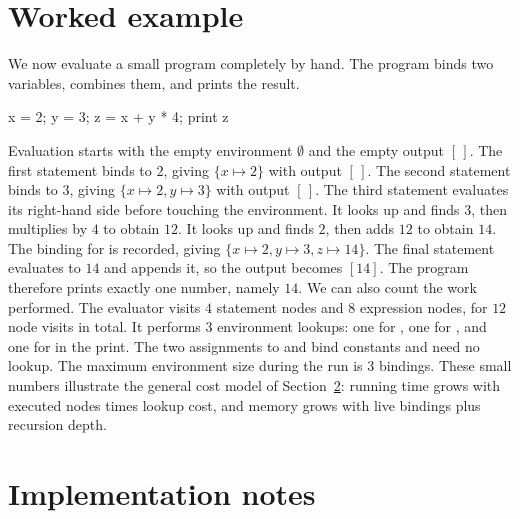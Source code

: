 \section{Worked example}
\label{sec:ch02-worked-example}

We now evaluate a small program completely by hand.
The program binds two variables, combines them, and prints the result.
\begin{irlisting}
x = 2;
y = 3;
z = x + y * 4;
print z
\end{irlisting}
Evaluation starts with the empty environment $\emptyset$ and the empty output $[\,]$.
The first statement binds  to $2$, giving $\{x \mapsto 2\}$ with output $[\,]$.
The second statement binds  to $3$, giving $\{x \mapsto 2, y \mapsto 3\}$ with output $[\,]$.
The third statement evaluates its right-hand side before touching the environment.
It looks up  and finds $3$, then multiplies by $4$ to obtain $12$.
It looks up  and finds $2$, then adds $12$ to obtain $14$.
The binding for  is recorded, giving $\{x \mapsto 2, y \mapsto 3, z \mapsto 14\}$.
The final statement evaluates  to $14$ and appends it, so the output becomes $[14]$.
The program therefore prints exactly one number, namely $14$.
We can also count the work performed.
The evaluator visits $4$ statement nodes and $8$ expression nodes, for $12$ node visits in total.
It performs $3$ environment lookups: one for , one for , and one for  in the print.
The two assignments to  and  bind constants and need no lookup.
The maximum environment size during the run is $3$ bindings.
These small numbers illustrate the general cost model of Section~\ref{sec:ch02-implementation}: running time grows with executed nodes times lookup cost, and memory grows with live bindings plus recursion depth.

\section{Implementation notes}
\label{sec:ch02-implementation}

